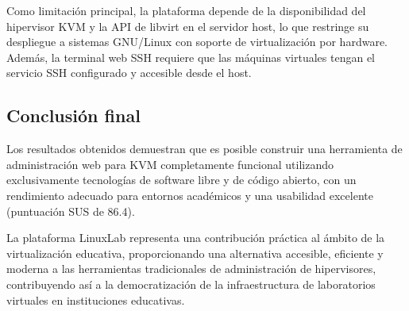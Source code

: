 Como limitación principal, la plataforma depende de la disponibilidad del
hipervisor KVM y la API de libvirt en el servidor host, lo que restringe su
despliegue a sistemas GNU/Linux con soporte de virtualización por hardware.
Además, la terminal web SSH requiere que las máquinas virtuales tengan el
servicio SSH configurado y accesible desde el host.

\subsection{Conclusión final}

Los resultados obtenidos demuestran que es posible construir una herramienta de
administración web para KVM completamente funcional utilizando exclusivamente
tecnologías de software libre y de código abierto, con un rendimiento adecuado
para entornos académicos y una usabilidad excelente (puntuación SUS de 86.4).

La plataforma LinuxLab representa una contribución práctica al ámbito de la
virtualización educativa, proporcionando una alternativa accesible, eficiente y
moderna a las herramientas tradicionales de administración de hipervisores,
contribuyendo así a la democratización de la infraestructura de laboratorios
virtuales en instituciones educativas.



